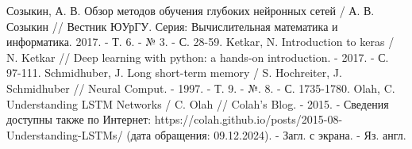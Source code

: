 \documentclass[bachelor, och, coursework]{SCWorks}
\begin{document}
\begin{thebibliography}{15}
    Созыкин, А. В. Обзор методов обучения глубоких нейронных сетей / А. В. Созыкин // Вестник ЮУрГУ. Серия: Вычислительная математика и информатика. 2017. - Т. 6. - № 3. - С. 28-59.
    Ketkar, N. Introduction to keras / N. Ketkar // Deep learning with python: a hands-on introduction. - 2017. - С. 97-111.
    Schmidhuber, J. Long short-term memory / S. Hochreiter, J. Schmidhuber // Neural Comput. - 1997. - Т. 9. - №. 8. - С. 1735-1780.
    Olah, C. Understanding LSTM Networks / C. Olah // Colah's Blog. - 2015. - Сведения доступны также по Интернет: https://colah.github.io/posts/2015-08-Understanding-LSTMs/ (дата обращения: 09.12.2024). - Загл. с экрана. - Яз. англ.
  \end{thebibliography}
\end{document}
